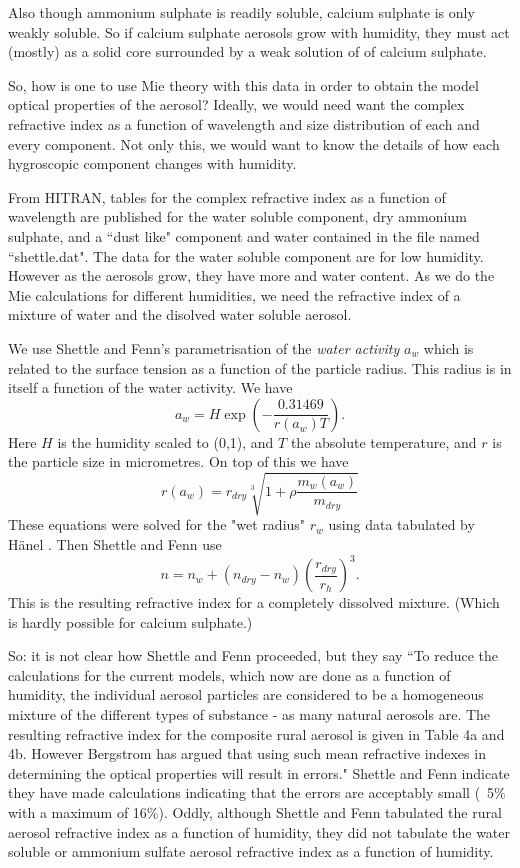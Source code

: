 \documentclass[12pt]{article}
\begin{document}
Also though ammonium sulphate is readily soluble, calcium sulphate
is only weakly soluble. So if calcium  sulphate aerosols grow with humidity, they must
act (mostly) as a solid core surrounded by a weak solution of of calcium sulphate.

So, how is one to use Mie theory with this data in order to obtain the model
optical properties of the aerosol? Ideally, we would need want the complex
refractive index as a function of wavelength and size distribution of each and every component.
Not only this, we would want to know the details of how each hygroscopic component
changes with humidity.


From HITRAN,  tables for the complex refractive index as a function of wavelength
are published for the water soluble component, dry ammonium sulphate, and a ``dust like" component
and  water contained in the file named ``shettle.dat".  The data for
the water soluble component are for low humidity. However as the
aerosols grow, they have more and water content. As we do the Mie
calculations for different humidities, we need the refractive index of a mixture
of  water and the disolved water soluble aerosol. 


We use Shettle and Fenn's parametrisation of the
{\it water activity} $a_w$ which is related to the surface tension as 
a function
of the particle radius. This radius is in itself a function of the water
 activity. We have
\begin{equation}
a_w=H \exp \left ( -\frac{0.31469}{r(a_w) T} \right).
\end{equation}
Here $H$ is the humidity scaled to (0,1), and  $T$ the absolute temperature, and $r$ is the particle
size in micrometres.
On top of this we have
\begin{equation}
r(a_w)= r_{dry}\sqrt[3]{1+\rho \frac{ m_w(a_w)}{m_{dry}}}
\end{equation}
These equations were solved for the "wet radius" $r_w$ using data tabulated by H\"anel \cite{Hanel:Mybib}. Then Shettle and Fenn
use
\begin{equation}
n=n_w+(n_{dry}-n_w) \left ( \frac{r_{dry}}{r_h} \right )^3.
\end{equation}
This is the resulting refractive index for a completely dissolved mixture. 
(Which is hardly possible for calcium sulphate.)

So: it is not clear how Shettle and Fenn proceeded, but they say ``To reduce the
calculations for the current models, which now are done as a function of
humidity, the individual aerosol particles are considered to be a homogeneous
mixture of the different types of substance - as many natural aerosols are. The
resulting  refractive index for the composite rural aerosol is given
 in Table 4a and 4b. However Bergstrom has argued that using such mean 
refractive indexes  in determining the optical properties will result in errors." Shettle and 
Fenn indicate they have made calculations indicating that the errors
are acceptably small (~5\% with a maximum of 16\%). Oddly, although Shettle and Fenn tabulated
the rural aerosol refractive index as a function of humidity, they did not tabulate
the water soluble or ammonium sulfate aerosol refractive index as a function of
humidity.
\end{document}
